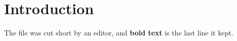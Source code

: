 \documentclass{article}
\begin{document}
\section{Introduction}
The file was cut short by an editor, and
\textbf{bold text} is the last line it kept.
\end{document}
